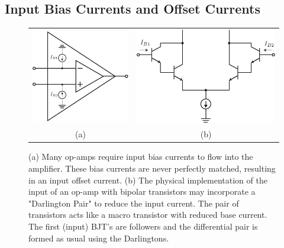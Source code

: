 \subsection{Input Bias Currents and Offset Currents}
\begin{figure}[tb]
\centering
\begin{tabular}{cc}
\includegraphics[scale=1]{opamp_offset_I} &
\includegraphics[scale=1]{bjt_input_darlington}\\
(a) & (b)\\
\end{tabular}
\caption{(a) Many op-amps require input bias currents to flow into the amplifier.  These bias currents are never perfectly matched, resulting in an input offset current. (b) The physical implementation of the input of an op-amp with bipolar transistors may incorporate a "Darlington Pair" to reduce the input current. The pair of transistors acts like a macro transistor with reduced base current. The first (input) BJT's are followers and the differential pair is formed as usual using the Darlingtons.}
\label{fig:opamp_offset_I}
\end{figure}
